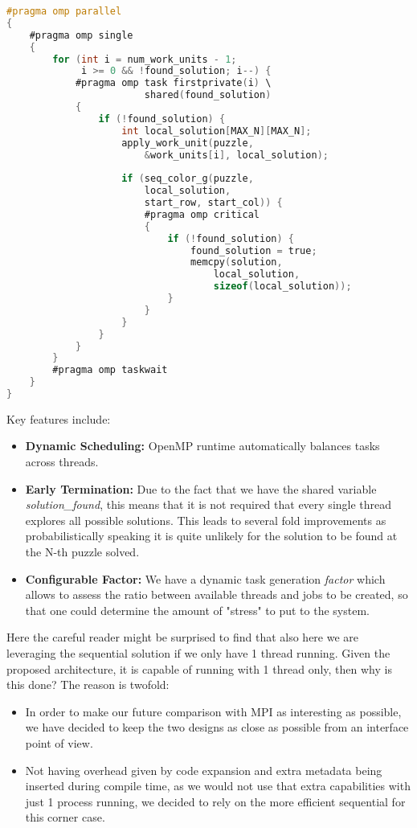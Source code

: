 \begin{lstlisting}[language=C, caption=OpenMP task generation, label={listing:omp_algorithm}]
#pragma omp parallel
{
    #pragma omp single
    {
        for (int i = num_work_units - 1; 
             i >= 0 && !found_solution; i--) {
            #pragma omp task firstprivate(i) \
                        shared(found_solution)
            {
                if (!found_solution) {
                    int local_solution[MAX_N][MAX_N];
                    apply_work_unit(puzzle, 
                        &work_units[i], local_solution);
                    
                    if (seq_color_g(puzzle, 
                        local_solution, 
                        start_row, start_col)) {
                        #pragma omp critical
                        {
                            if (!found_solution) {
                                found_solution = true;
                                memcpy(solution, 
                                    local_solution, 
                                    sizeof(local_solution));
                            }
                        }
                    }
                }
            }
        }
        #pragma omp taskwait
    }
}
\end{lstlisting}

Key features include:
\begin{itemize}
    \item \textbf{Dynamic Scheduling:} OpenMP runtime automatically balances tasks across threads.
    \item \textbf{Early Termination:} Due to the fact that we have the shared variable \textit{solution\_found}, this means that it is not required that every single thread explores all possible solutions. This leads to several fold improvements as probabilistically speaking it is quite unlikely for the solution to be found at the N-th puzzle solved.
    \item \textbf{Configurable Factor:} We have a dynamic task generation \textit{factor} which allows to assess the ratio between available threads and jobs to be created, so that one could determine the amount of "stress" to put to the system.
\end{itemize}


Here the careful reader might be surprised to find that also here we are leveraging the sequential solution if we only have 1 thread running. Given the proposed architecture, it is capable of running with 1 thread only, then why is this done? The reason is twofold:
\begin{itemize}
    \item In order to make our future comparison with MPI as interesting as possible, we have decided to keep the two designs as close as possible from an interface point of view.
    \item Not having overhead given by code expansion and extra metadata being inserted during compile time, as we would not use that extra capabilities with just 1 process running, we decided to rely on the more efficient sequential for this corner case.
\end{itemize}

